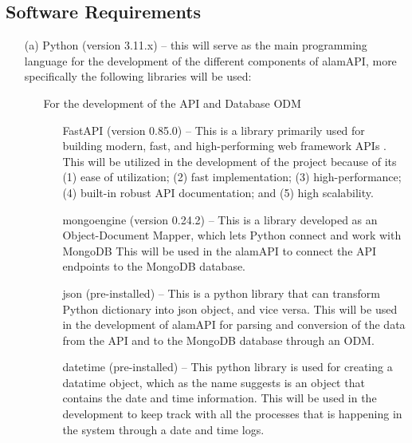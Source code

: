 \subsection{Software Requirements}
\label{sec:software_requirements}
\begin{itemize}
    \item[(a)] Python (version 3.11.x) – this will serve as the main programming 
    language for the development of the different components of alamAPI, more 
    specifically the following libraries will be used:
        \begin{itemize}
            \item[\ding{108}] For the development of the API and Database ODM
                \begin{itemize}
                    \item[\ding{109}] FastAPI (version 0.85.0) – This is a library primarily 
                    used for building modern, fast, and high-performing web framework APIs 
                    \cite{Tiangolo}.
                    This will be utilized in the development of the project because of its 
                    (1) ease of utilization; 
                    (2) fast implementation; 
                    (3) high-performance; 
                    (4) built-in robust API documentation; and 
                    (5) high scalability.
                    \item[\ding{109}] mongoengine (version 0.24.2) – This is a library developed 
                    as an Object-Document Mapper, which lets Python connect and work with MongoDB 
                    \cite{MongoEngine}
                    This will be used in the alamAPI to connect the API endpoints to the 
                    MongoDB database.
                    \item[\ding{109}] json (pre-installed) – This is a python library that 
                    can transform Python dictionary into json object, and vice versa. 
                    This will be used in the development of alamAPI for parsing and conversion of 
                    the data from the API and to the MongoDB database through an ODM.
                    \item[\ding{109}] datetime (pre-installed) – This python library is used for creating 
                    a datatime object, which as the name suggests is an object that contains the date 
                    and time information. This will be used in the development to keep track with all 
                    the processes that is happening in the system through a date and time logs.

\end{itemize}
\end{itemize}
\end{itemize}

